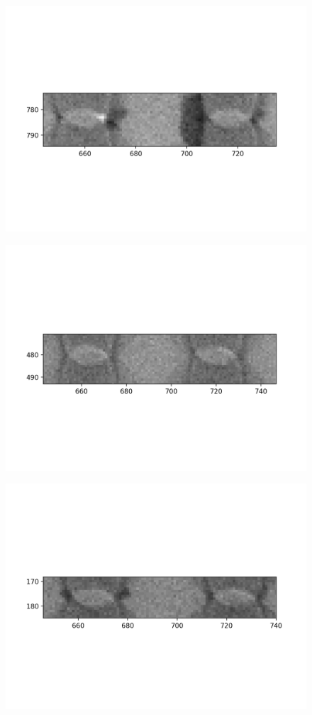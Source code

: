 \documentclass[10pt,a4paper]{article}
\begin{document}
\begin{figure}
	\includegraphics{data/image_stamps/d10}
\end{figure}
\begin{figure}
	\includegraphics{data/image_stamps/d11}
\end{figure}
\begin{figure}
	\includegraphics{data/image_stamps/d12}
\end{figure}
\end{document}
